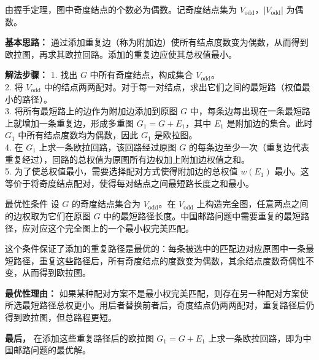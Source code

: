 \documentclass[lang=cn,11pt]{elegantbook}
\begin{document}
由握手定理，图中奇度结点的个数必为偶数。记奇度结点集为 $V_{\text{odd}}$，$|V_{\text{odd}}|$ 为偶数。

\textbf{基本思路：} 通过添加重复边（称为附加边）使所有结点度数变为偶数，从而得到欧拉图，再求其欧拉回路。添加的重复边应使其总权值最小。

\textbf{解法步骤：}
1. 找出 $G$ 中所有奇度结点，构成集合 $V_{\text{odd}}$。\\
    2. 将 $V_{\text{odd}}$ 中的结点两两配对。对于每一对结点，求出它们之间的最短路（权值最小的路径）。\\
    3. 将所有最短路上的边作为附加边添加到原图 $G$ 中，每条边每出现在一条最短路上就增加一条重复边，形成多重图 $G_1 = G + E_1$，其中 $E_1$ 是附加边的集合。此时 $G_1$ 中所有结点度数均为偶数，因此 $G_1$ 是欧拉图。\\
    4. 在 $G_1$ 上求一条欧拉回路，该回路经过原图 $G$ 的每条边至少一次（重复边代表重复经过），回路的总权值为原图所有边权加上附加边权值之和。\\
    5. 为了使总权值最小，需要选择配对方式使得附加边的总权值 $w(E_1)$ 最小。这等价于将奇度结点配对，使得每对结点之间最短路长度之和最小。

\begin{theorem}{最优性条件}
    设 $G$ 的奇度结点集合为 $V_{\text{odd}}$。在 $V_{\text{odd}}$ 上构造完全图，任意两点之间的边权取为它们在原图 $G$ 中的最短路径长度。中国邮路问题中需要重复的最短路径，应对应这个完全图上的一个最小权完美匹配。
\end{theorem}
    这个条件保证了添加的重复路径是最优的：每条被选中的匹配边对应原图中一条最短路径，重复这些路径后，所有奇度结点的度数变为偶数，其余结点度数奇偶性不变，从而得到欧拉图。

    \textbf{最优性理由：}
    如果某种配对方案不是最小权完美匹配，则存在另一种配对方案使所选最短路径总权更小。用后者替换前者后，奇度结点仍两两配对，重复路径后仍得到欧拉图，但总路程更短。

    \textbf{最后，} 在添加这些重复路径后的欧拉图 $G_1 = G + E_1$ 上求一条欧拉回路，即为中国邮路问题的最优解。
\end{document}

